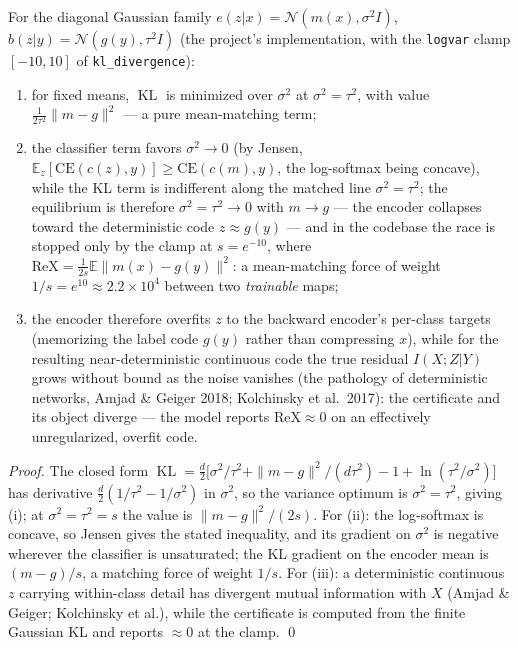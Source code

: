 \begin{proposition}\label{prop:variance}
For the diagonal Gaussian family $e(z|x) = \mathcal{N}(m(x), \sigma^2 I)$,
$b(z|y) = \mathcal{N}(g(y), \tau^2 I)$ (the project's implementation, with the
\texttt{logvar} clamp $[-10, 10]$ of \texttt{kl\_divergence}):
\begin{enumerate}
\item[(i)] for fixed means, $\operatorname{KL}$ is minimized over $\sigma^2$ at
$\sigma^2 = \tau^2$, with value $\tfrac{1}{2\tau^2}\|m - g\|^2$ --- a pure mean-matching
term;
\item[(ii)] the classifier term favors $\sigma^2 \to 0$ (by Jensen,
$\mathbb{E}_z[\mathrm{CE}(c(z), y)] \ge \mathrm{CE}(c(m), y)$, the log-softmax being
concave), while the KL term is indifferent along the matched line $\sigma^2 = \tau^2$;
the equilibrium is therefore $\sigma^2 = \tau^2 \to 0$ with $m \to g$ --- the encoder
collapses toward the deterministic code $z \approx g(y)$ --- and in the codebase the race
is stopped only by the clamp at $s = e^{-10}$, where
$\mathrm{ReX} = \tfrac{1}{2s}\mathbb{E}\|m(x) - g(y)\|^2$: a mean-matching force of
weight $1/s = e^{10} \approx 2.2\times10^{4}$ between two \emph{trainable} maps;
\item[(iii)] the encoder therefore overfits $z$ to the backward encoder's per-class
targets (memorizing the label code $g(y)$ rather than compressing $x$), while for the
resulting near-deterministic continuous code the true residual $I(X;Z|Y)$ grows without
bound as the noise vanishes (the pathology of deterministic networks, Amjad \& Geiger
2018; Kolchinsky et al.\ 2017): the
certificate and its object diverge --- the model reports $\mathrm{ReX} \approx 0$ on an
effectively unregularized, overfit code.
\end{enumerate}
\end{proposition}

\begin{proof}
The closed form
$\operatorname{KL} = \tfrac{d}{2}\big[\sigma^2/\tau^2 + \|m-g\|^2/(d\tau^2)
- 1 + \ln(\tau^2/\sigma^2)\big]$ has derivative $\tfrac{d}{2}(1/\tau^2 - 1/\sigma^2)$
in $\sigma^2$, so the variance optimum is $\sigma^2 = \tau^2$, giving (i); at
$\sigma^2 = \tau^2 = s$ the value is $\|m-g\|^2/(2s)$. For (ii): the log-softmax is
concave, so Jensen gives the stated inequality, and its gradient on $\sigma^2$ is
negative wherever the classifier is unsaturated; the KL gradient on the encoder mean is
$(m - g)/s$, a matching force of weight $1/s$. For (iii): a deterministic continuous $z$
carrying within-class detail has divergent mutual information with $X$ (Amjad \& Geiger;
Kolchinsky et al.), while the certificate is computed from the finite Gaussian KL and
reports $\approx 0$ at the clamp. \hfill\qed
\end{proof}

